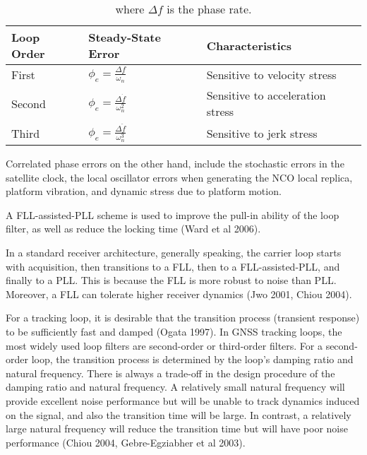 \begin{table}[!htb]
\centering
\begin{tabular}{|l|l|l|}
\hline
\rowcolor[HTML]{C0C0C0} 
Loop Order & Steady-State Error                                                 & Characteristics                  \\ \hline
First      & $\phi_e = \frac{\Delta f}{\omega_n}$                            & Sensitive to velocity stress     \\ \hline
\rowcolor[HTML]{EFEFEF} 
Second     & $\phi_e = \frac{\Delta \dot{f}}{\omega^2 _n}$  & Sensitive to acceleration stress \\ \hline
Third      & $\phi_e = \frac{\Delta \ddot{f}}{\omega^3 _n}$ & Sensitive to jerk stress         \\ \hline
\end{tabular}
\caption{where $\Delta f$ is the phase rate.}
\label{tab:NoIdea}
\end{table}


Correlated phase errors on the other hand, include the stochastic errors in the satellite clock, the local oscillator errors when generating the NCO local replica, platform vibration, and dynamic stress due to platform motion.


A FLL-assisted-PLL scheme is used to improve the pull-in ability of the loop filter, as well as reduce the locking time (Ward et al 2006).

In a standard receiver architecture, generally speaking, the carrier loop starts with acquisition, then transitions to a FLL, then to a FLL-assisted-PLL, and finally to a PLL. This is because the FLL is more robust to noise than PLL. Moreover, a FLL
can tolerate higher receiver dynamics (Jwo 2001, Chiou 2004).


For a tracking loop, it is desirable that the transition process (transient response) to be sufficiently fast and damped (Ogata 1997). In GNSS tracking loops, the most widely used loop filters are second-order or third-order filters. For a second-order loop, the transition process is determined by the loop's damping ratio and natural frequency. There is always a trade-off in the design procedure of the damping ratio and natural frequency. A relatively small natural frequency will provide excellent noise performance but will be unable to track dynamics induced on the signal, and also the transition time will be large. In contrast, a relatively large natural frequency will reduce the transition time but will have poor noise performance (Chiou 2004, Gebre-Egziabher et al 2003).



